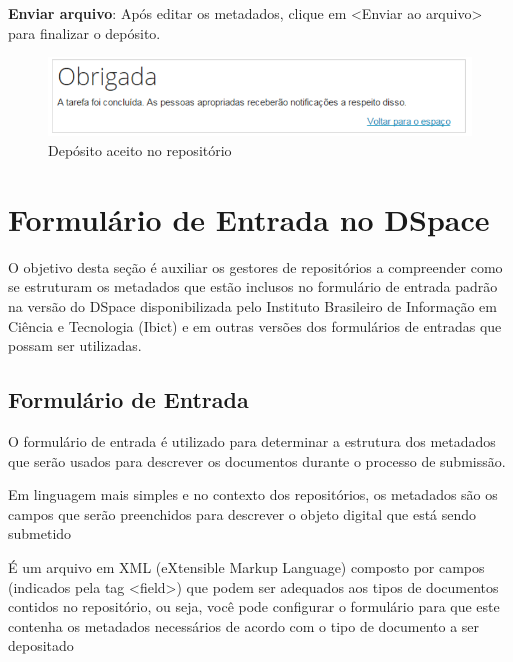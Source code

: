 \documentclass[12pt,hidelinks]{article}
\begin{document}
    \textbf{Enviar arquivo}: Após editar os metadados, clique em <Enviar ao arquivo> para finalizar o depósito.
    
    \begin{figure}[!htp]
                \centering
                \includegraphics[scale=0.7]{figura/Figura179.png}
                \caption{Depósito aceito no repositório}
            \label{Rotulo}
        \end{figure}
    
\newpage
\section{Formulário de Entrada no DSpace}
\newpage
    
    O objetivo desta seção é auxiliar os gestores de repositórios a compreender como se estruturam os metadados que estão inclusos no formulário de entrada padrão na versão do DSpace disponibilizada pelo Instituto Brasileiro de Informação em Ciência e Tecnologia (Ibict) e em outras versões dos formulários de entradas que possam ser utilizadas.
    
    \subsection{Formulário de Entrada}
    
    O formulário de entrada é utilizado para determinar a estrutura dos metadados que serão usados para descrever os documentos durante o processo de submissão. 
    
    \singlespacing
    
    Em linguagem mais simples e no contexto dos repositórios, os metadados são os campos que serão preenchidos para descrever o objeto digital que está sendo submetido
    
    \singlespacing
    
    É um arquivo em XML (eXtensible Markup Language) composto por campos (indicados pela tag <\textcolor{applegreen}{field}>) que podem ser adequados aos tipos de documentos contidos no repositório, ou seja, você pode configurar o formulário para que este contenha os metadados necessários de acordo com o tipo de documento a ser depositado
    
\end{document}
